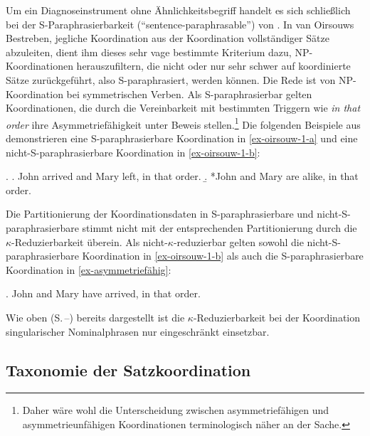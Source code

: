 Um ein Diagnoseinstrument ohne Ähnlichkeitsbegriff handelt es sich schlie\ss lich bei der S-Para\-phra\-sier\-barkeit ("`sentence-paraphrasable"') von \citet[13f]{Oirsouw:87}. In van Oirsouws Bestreben, jegliche Koordination aus der Koordination vollständiger Sätze abzuleiten, dient ihm dieses sehr vage bestimmte Kriterium dazu, NP-Koordinationen herauszufiltern, die nicht oder nur sehr schwer auf koordinierte Sätze zurückgeführt, also S-paraphrasiert, werden können. Die Rede ist von NP-Koordination bei symmetrischen Verben. Als S-paraphrasierbar gelten Koordinationen, die durch die Vereinbarkeit mit bestimmten Triggern wie {\it in that order} ihre Asymmetriefähigkeit unter Beweis stellen.\footnote{Daher wäre wohl die Unterscheidung zwischen asymmetriefähigen und asymmetrieunfähigen Koordinationen terminologisch näher an der Sache.} Die folgenden Beispiele aus \citet[13f]{Oirsouw:87} demonstrieren eine S-paraphrasierbare Koordination in \ref{ex-oirsouw-1-a} und eine nicht-S-paraphrasierbare Koordination in \ref{ex-oirsouw-1-b}:   

\ex. \label{ex-oirsouw-1}
\a. John arrived and Mary left, in that order.\label{ex-oirsouw-1-a}
\b. *John and Mary are alike, in that order.\label{ex-oirsouw-1-b}

Die Partitionierung der Koordinationsdaten in S-paraphrasierbare und nicht-S-paraphrasier\-ba\-re stimmt nicht mit der entsprechenden Partitionierung durch die $\kappa$-Reduzierbarkeit überein. Als nicht-$\kappa$-reduzierbar gelten sowohl die nicht-S-paraphrasierbare Koordination in \ref{ex-oirsouw-1-b} als auch die S-paraphrasierbare Koordination in \ref{ex-asymmetriefähig}: 

\ex. \label{ex-asymmetriefähig} John and Mary have arrived, in that order.
 
Wie oben (S.\,\pageref{sec-plural}--\pageref{sec:asymmetrische:koordination}) bereits dargestellt ist die $\kappa$-Reduzierbarkeit bei der Koordination singularischer Nominalphrasen nur eingeschränkt einsetzbar.



\subsection{Taxonomie der Satzkoordination}

